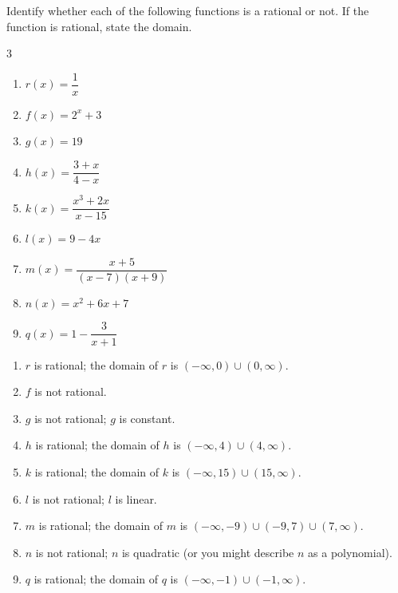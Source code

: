 	 \begin{pccexample}
		 Identify whether each of the following functions is a rational or not. If
		 the function is rational, state the domain.
		 \begin{multicols}{3}
			 \begin{enumerate}
				 \item $r(x)=\dfrac{1}{x}$
				 \item $f(x)=2^x+3$
				 \item $g(x)=19$
				 \item $h(x)=\dfrac{3+x}{4-x}$
				 \item $k(x)=\dfrac{x^3+2x}{x-15}$
				 \item $l(x)=9-4x$
				 \item $m(x)=\dfrac{x+5}{(x-7)(x+9)}$
				 \item $n(x)=x^2+6x+7$
				 \item $q(x)=1-\dfrac{3}{x+1}$
			 \end{enumerate}
		 \end{multicols}
		 \begin{pccsolution}
			 \begin{enumerate}
				 \item $r$ is rational; the domain of $r$ is $(-\infty,0)\cup(0,\infty)$.
				 \item $f$ is not rational.
				 \item $g$ is not rational; $g$ is constant.
				 \item $h$ is rational; the domain of $h$ is $(-\infty,4)\cup(4,\infty)$.
				 \item $k$ is rational; the domain of $k$ is $(-\infty,15)\cup(15,\infty)$.
				 \item $l$ is not rational; $l$ is linear.
				 \item $m$ is rational; the domain of $m$ is $(-\infty,-9)\cup(-9,7)\cup(7,\infty)$.
				 \item $n$ is not rational; $n$ is quadratic (or you might describe $n$ as a polynomial).
				 \item $q$ is rational; the domain of $q$ is $(-\infty,-1)\cup (-1,\infty)$.
			 \end{enumerate}
		 \end{pccsolution}
	 \end{pccexample}

